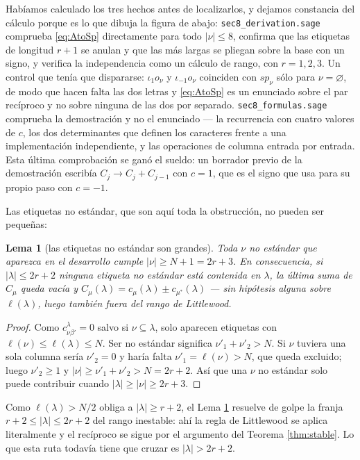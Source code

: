 \documentclass[11pt,reqno]{amsart}
\theoremstyle{plain}
\newtheorem{lemma}[theorem]{Lema}
\theoremstyle{definition}
\begin{document}
Habíamos calculado los tres hechos antes de localizarlos, y dejamos constancia del cálculo porque es
lo que dibuja la figura de abajo: \texttt{sec8\_derivation.sage} comprueba \eqref{eq:AtoSp}
directamente para todo $|\nu|\le8$, confirma que las etiquetas de longitud $r+1$ se anulan y que las
más largas se pliegan sobre la base con un signo, y verifica la independencia como un cálculo de
rango, con $r=1,2,3$. Un control que tenía que dispararse: $\iota_1 o_\nu$ y $\iota_{-1}o_\nu$
coinciden con $sp_\nu$ sólo para $\nu=\varnothing$, de modo que hacen falta las dos letras y
\eqref{eq:AtoSp} es un enunciado sobre el par recíproco y no sobre ninguna de las dos por separado.
\texttt{sec8\_formulas.sage} comprueba la demostración y no el enunciado --- la recurrencia con cuatro
valores de $c$, los dos determinantes que definen los caracteres frente a una implementación
independiente, y las operaciones de columna entrada por entrada. Esta última comprobación se ganó el
sueldo: un borrador previo de la demostración escribía $C_j\to C_j+C_{j-1}$ con $c=1$, que es el signo
que \cite[Lema 3.2]{AK25} usa para su propio paso con $c=-1$.

Las etiquetas no estándar, que son aquí toda la obstrucción, no pueden ser pequeñas:

\begin{lemma}[las etiquetas no estándar son grandes]\label{lem:nonstd}
Toda $\nu$ no estándar que aparezca en el desarrollo cumple $|\nu|\ge N+1=2r+3$. En consecuencia, si
$|\lambda|\le2r+2$ ninguna etiqueta no estándar está contenida en $\lambda$, la última suma de $C_\mu$
queda vacía y $C_\mu(\lambda)=c_\mu(\lambda)\pm c_{\mu^{*}}(\lambda)$ --- sin hipótesis alguna sobre
$\ell(\lambda)$, luego también fuera del rango de Littlewood.
\end{lemma}

\begin{proof}
Como $c^{\lambda}_{\nu\beta'}=0$ salvo si $\nu\subseteq\lambda$, solo aparecen etiquetas con
$\ell(\nu)\le\ell(\lambda)\le N$. Ser no estándar significa $\nu'_1+\nu'_2>N$. Si $\nu$ tuviera una
sola columna sería $\nu'_2=0$ y haría falta $\nu'_1=\ell(\nu)>N$, que queda excluido; luego
$\nu'_2\ge1$ y $|\nu|\ge\nu'_1+\nu'_2>N=2r+2$. Así que una $\nu$ no estándar solo puede contribuir
cuando $|\lambda|\ge|\nu|\ge2r+3$.
\end{proof}

\noindent Como $\ell(\lambda)>N/2$ obliga a $|\lambda|\ge r+2$, el Lema \ref{lem:nonstd} resuelve de
golpe la franja $r+2\le|\lambda|\le2r+2$ del rango inestable: ahí la regla de Littlewood se aplica
literalmente y el recíproco se sigue por el argumento del Teorema \ref{thm:stable}. Lo que esta ruta
todavía tiene que cruzar es $|\lambda|>2r+2$.
\end{document}
